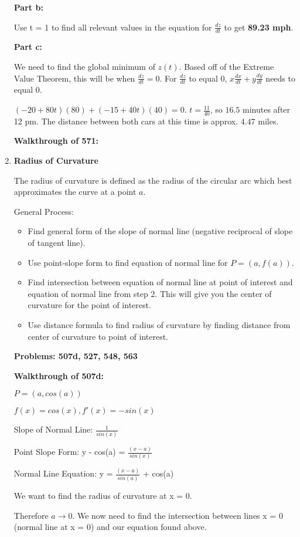 \documentclass[11pt,twoside]{article}
\begin{document}
\begin{enumerate}
\textbf{Part b:}

Use t = 1 to find all relevant values in the equation for $\frac{dz}{dt}$ to get \textbf{89.23 mph}.

\textbf{Part c:}

We need to find the global minimum of $z(t)$. Based off of the Extreme Value Theorem, this will be when $\frac{dz}{dt} = 0$. For $\frac{dz}{dt}$ to equal $0$, $x\frac{dx}{dt} + y\frac{dy}{dt}$ needs to equal $0$.

$(-20 + 80t)(80) + (-15 + 40t)(40) = 0$. $t = \frac{11}{40}$, so $16.5$ minutes after 12 pm. The distance between both cars at this time is approx. $4.47$ miles.

\textbf{Walkthrough of 571:} 

\item \textbf{Radius of Curvature} 

The radius of curvature is defined as the radius of the circular arc which best approximates the curve at a point $a$. 

General Process:
\begin{itemize}
    \item Find general form of the slope of normal line (negative reciprocal of slope of tangent line). 
    \item Use point-slope form to find equation of normal line for $P = (a, f(a))$. 
    \item Find intersection between equation of normal line at point of interest and equation of normal line from step 2. This will give you the center of curvature for the point of interest.
    \item Use distance formula to find radius of curvature by finding distance from center of curvature to point of interest. 
\end{itemize}

\textbf{Problems: 507d, 527, 548, 563}

\textbf{Walkthrough of 507d:}

$P = (a, cos(a))$

$f(x) = cos(x), f'(x) = -sin(x)$

Slope of Normal Line: \(\frac{1}{sin(x)}\)

Point Slope Form: y - cos(a) = \(\frac{(x-a)}{sin(x)}\)

Normal Line Equation: y = \(\frac{(x-a)}{sin(a)}\) + cos(a)

We want to find the radius of curvature at x = 0.

Therefore $a \rightarrow\text{0}$. We now need to find the intersection between lines x = 0 (normal line at x = 0) and our equation found above.


\end{enumerate}
\end{document}
